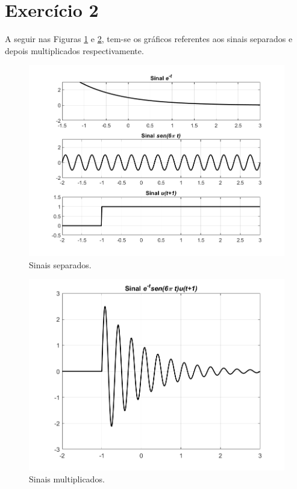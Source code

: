 \documentclass[a4paper,12pt,oneside,openany,table,xcdraw]{article}
\begin{document}
\vspace{0.3cm}
\section{Exercício 2}
A seguir nas Figuras \ref{ex2:separado} e \ref{ex2:mult}, tem-se os gráficos referentes aos sinais separados e depois multiplicados respectivamente.

\vspace{0.4cm}
\begin{figure}[H]
\centering
\includegraphics[width=14cm]{ex2-separado}
\caption{Sinais separados.}
\label{ex2:separado}
\end{figure}

\vspace{0.4cm}
\begin{figure}[H]
\centering
\includegraphics[width=14cm]{ex2-mult}
\caption{Sinais multiplicados.}
\label{ex2:mult}
\end{figure}
\end{document}

